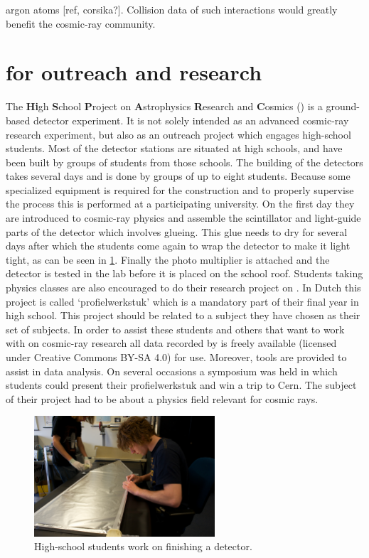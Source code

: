 argon atoms [ref, corsika?]. Collision data of such interactions would greatly benefit the cosmic-ray community.


\section{\hisparc for outreach and research}

The \textbf{Hi}gh \textbf{S}chool \textbf{P}roject on \textbf{A}strophysics \textbf{R}esearch and \textbf{C}osmics (\hisparc) is a ground-based detector experiment. It is not solely intended as an advanced cosmic-ray research experiment, but also as an outreach project which engages high-school students. Most of the \hisparc detector stations are situated at high schools, and have been built by groups of students from those schools. The building of the detectors takes several days and is done by groups of up to eight students. Because some specialized equipment is required for the construction and to properly supervise the process this is performed at a participating university. On the first day they are introduced to cosmic-ray physics and assemble the scintillator and light-guide parts of the detector which involves glueing. This glue needs to dry for several days after which the students come again to wrap the detector to make it light tight, as can be seen in \cref{fig:detector-bouw}. Finally the photo multiplier is attached and the detector is tested in the lab before it is placed on the school roof. Students taking physics classes are also encouraged to do their research project on \hisparc. In Dutch this project is called `profielwerkstuk' which is a mandatory part of their final year in high school. This project should be related to a subject they have chosen as their set of subjects. In order to assist these students and others that want to work with on cosmic-ray research all data recorded by \hisparc is freely available (licensed under Creative Commons BY-SA 4.0) for use. Moreover, tools are provided to assist in data analysis. On several occasions a symposium was held in which students could present their profielwerkstuk and win a trip to Cern. The subject of their project had to be about a physics field relevant for cosmic rays.

\begin{figure}
    \centering
    \includegraphics[width=0.6\textwidth]
                    {plots/cosmic-rays/ADL_100352}
    \caption{High-school students work on finishing a detector.}
    \label{fig:detector-bouw}
\end{figure}


